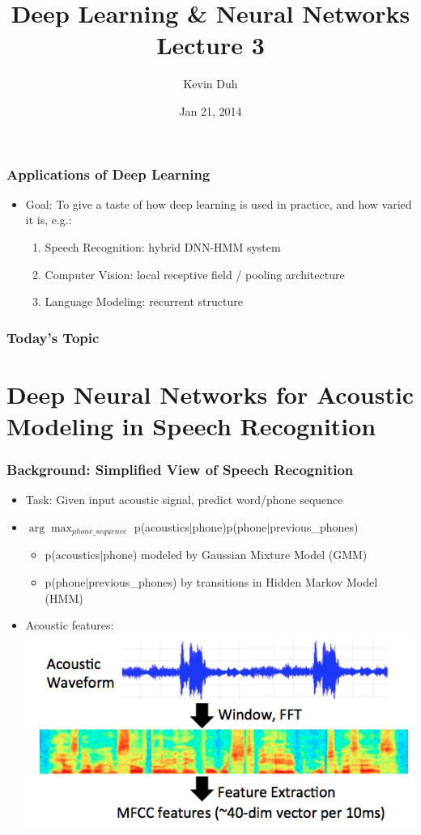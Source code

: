 \documentclass{beamer}
\title[Deep Learning]{Deep Learning \& Neural Networks\\Lecture 3}
\author[K. Duh]{Kevin Duh}
\institute[]{Graduate School of Information Science\\Nara Institute of Science and Technology}
\date{Jan 21, 2014}
\newcommand{\bi}{\begin{itemize}}
\newcommand{\ei}{\end{itemize}}
\newcommand{\be}{\begin{enumerate}}
\newcommand{\ee}{\end{enumerate}}
\begin{document}
\begin{frame}[plain]
\titlepage
\end{frame}





\begin{frame}
\frametitle{Applications of Deep Learning }
\bi
\item Goal: To give a taste of how deep learning is used in practice, and how varied it is, e.g.:
	\be
	\item Speech Recognition: hybrid DNN-HMM system
	\item Computer Vision: local receptive field / pooling architecture
	\item Language Modeling: recurrent structure
	\ee
\ei
\end{frame}


\begin{frame}
\frametitle{Today's Topic}
\tableofcontents
\end{frame}



\section{Deep Neural Networks for Acoustic Modeling in Speech Recognition  \cite{hinton12speech}}



\begin{frame}
\frametitle{Background: Simplified View of Speech Recognition}
\bi
\item Task: Given input acoustic signal, predict word/phone sequence
\item $\arg\max_{phone\_sequence}$ p(acoustics$|$phone)p(phone$|$previous\_phones)
\bi
	\item p(acoustics$|$phone) modeled by Gaussian Mixture Model (GMM)
	\item p(phone$|$previous\_phones) by transitions in Hidden Markov Model (HMM)
\ei 
\item Acoustic features:\\
\includegraphics[scale=0.4]{figs/spectogram}
\ei
\end{frame}
\end{document}
